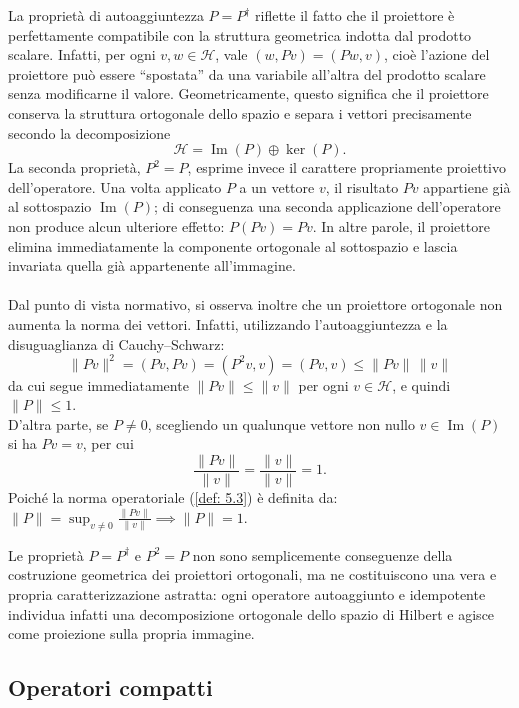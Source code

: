 \documentclass[a4paper,12pt]{report}
\begin{document}
La proprietà di autoaggiuntezza \(P=P^\dagger\) riflette il fatto che il proiettore è perfettamente compatibile con la struttura geometrica indotta dal prodotto scalare. Infatti, per ogni \(v,w\in\mathscr{H}\), vale $(w,Pv)=(Pw,v)$, cioè l’azione del proiettore può essere “spostata” da una variabile all’altra del prodotto scalare senza modificarne il valore. Geometricamente, questo significa che il proiettore conserva la struttura ortogonale dello spazio e separa i vettori precisamente secondo la decomposizione
\[
\mathscr{H}=\operatorname{Im}(P)\oplus\ker(P).
\]
La seconda proprietà, \(P^2=P\), esprime invece il carattere propriamente proiettivo dell’operatore. Una volta applicato \(P\) a un vettore \(v\), il risultato \(Pv\) appartiene già al sottospazio \(\operatorname{Im}(P)\); di conseguenza una seconda applicazione dell’operatore non produce alcun ulteriore effetto: $P(Pv)=Pv$.
In altre parole, il proiettore elimina immediatamente la componente ortogonale al sottospazio e lascia invariata quella già appartenente all’immagine.
\\
\\Dal punto di vista normativo, si osserva inoltre che un proiettore ortogonale non aumenta la norma dei vettori. Infatti, utilizzando l’autoaggiuntezza e la disuguaglianza di Cauchy--Schwarz:
\[
\|Pv\|^2 = (Pv,Pv) = (P^2v,v) = (Pv,v)\leq \|Pv\|\,\|v\|
\]
da cui segue immediatamente \(\|Pv\|\leq \|v\|\) per ogni \(v\in\mathscr{H}\), e quindi \(\|P\|\leq 1\).
\\D’altra parte, se \(P\neq 0\), scegliendo un qualunque vettore non nullo \(v\in \operatorname{Im}(P)\) si ha \(Pv=v\), per cui
\[
\frac{\|Pv\|}{\|v\|}=\frac{\|v\|}{\|v\|}=1.
\]
Poiché la norma operatoriale (\ref{def: 5.3}) è definita da: $\|P\|=\sup_{v\neq 0}\frac{\|Pv\|}{\|v\|}\implies 
\|P\|=1$.

Le proprietà $P=P^\dagger$ e $P^2=P$ non sono semplicemente conseguenze della costruzione geometrica dei proiettori ortogonali, ma ne costituiscono una vera e propria caratterizzazione astratta: ogni operatore autoaggiunto e idempotente individua infatti una decomposizione ortogonale dello spazio di Hilbert e agisce come proiezione sulla propria immagine.

\subsection{Operatori compatti}
\end{document}
